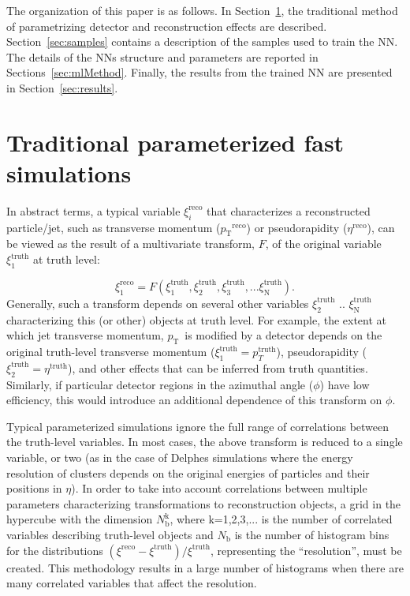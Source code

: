 \documentclass[showpacs,showkeys,preprint,prd,nofootinbib,linenumbers,12pt,superscriptaddress]{revtex4-1}
\def\pt{\ensuremath{p_{\mathrm{T}}}}
\def\genRes{\ensuremath{(\xi^{\mathrm{reco}}-\xi^{\mathrm{truth}})/\xi^{\mathrm{truth}}}}
\begin{document}
The organization of this paper is as follows. In Section~\ref{sec:tradMethod}, the traditional method of parametrizing detector and reconstruction effects are described. Section~\ref{sec:samples} contains a description of the samples used to train the NN. The details of the NNs structure and parameters are reported in Sections~\ref{sec:mlMethod}. Finally, the results from the trained NN are presented in Section~\ref{sec:results}.
\FloatBarrier

\section{Traditional parameterized fast simulations}
\label{sec:tradMethod}
In abstract terms, a typical variable $\xi_i^{\mathrm{reco}}$ that characterizes a reconstructed particle/jet, such as transverse momentum (\pt$^{\mathrm{reco}}$) or pseudorapidity ($\eta^{\mathrm{reco}}$), can be viewed as the result of a multivariate transform, $F$, of the original variable $\xi_1^{\mathrm{truth}}$ at truth level:

$$
\xi_1^{\mathrm{reco}} = F (\xi_1^{\mathrm{truth}}, \xi_2^{\mathrm{truth}}, \xi_3^{\mathrm{truth}}, ...\xi_{\mathrm{N}}^{\mathrm{truth}}).
$$
Generally, such a transform  depends on several other variables $\xi_2^{\mathrm{truth}}$ ..  $\xi_{\mathrm{N}}^{\mathrm{truth}}$ characterizing this (or other) objects at truth level. For example, the extent at which jet transverse momentum, \pt\ is modified by a detector depends on the original truth-level transverse momentum ($\xi_1^{\mathrm{truth}}=p_T^{\mathrm{truth}}$), pseudorapidity ($\xi_2^{\mathrm{truth}}=\eta^{\mathrm{truth}}$), and other effects that can be inferred from truth quantities. Similarly, if particular detector regions in the azimuthal angle ($\phi$) have low efficiency, this would introduce an additional dependence of this transform on $\phi$.

 Typical parameterized simulations ignore the full range of correlations between the truth-level variables. In most cases, the above transform is reduced to a single variable, or two (as in the case of Delphes simulations where the energy resolution of clusters depends on the original energies of particles and their positions in $\eta$). In order to take into account correlations between multiple parameters characterizing transformations to reconstruction objects, a grid in the hypercube with the dimension $N_{\mathrm{b}}^{\mathrm{k}}$, where k=1,2,3,... is the number of correlated variables describing truth-level objects and $N_{\mathrm{b}}$ is the number of histogram bins for the distributions \genRes, representing the ``resolution'', must be created. This methodology results in a large number of histograms when there are many correlated variables that affect the resolution.
\end{document}
